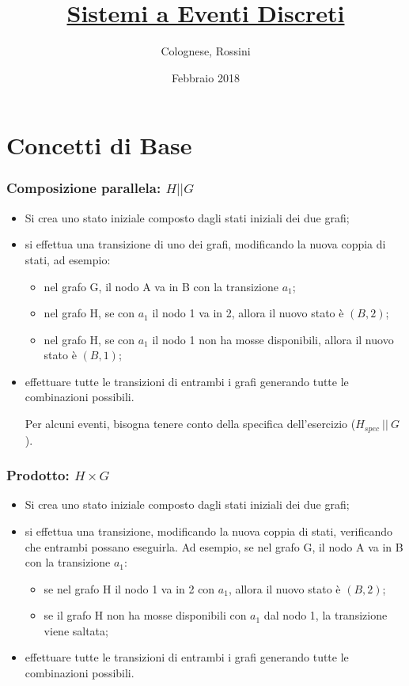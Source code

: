 \documentclass[a4paper, notitlepage, 10pt]{report}
\makeatletter
\newcommand*{\toccontents}{\@starttoc{toc}}
\makeatother
\begin{document}
	\title{\textbf{\underline{Sistemi a Eventi Discreti}}}
	\date{Febbraio 2018}
	\author{Colognese, Rossini}
	\maketitle
	
	\toccontents

\chapter*{Concetti di Base}

\subsection*{Composizione parallela: $H || G$}
\begin{itemize}
	\item Si crea uno stato iniziale composto dagli stati iniziali dei due grafi;
	\item si effettua una transizione di uno dei grafi, modificando la nuova coppia di stati, ad esempio:
	\begin{itemize}
		\item nel grafo G, il nodo A va in B con la transizione $a_1$;
		\item nel grafo H, se con $a_1$ il nodo 1 va in 2, allora il nuovo stato è $(B, 2)$;
		\item nel grafo H, se con $a_1$ il nodo 1 non ha mosse disponibili, allora il nuovo stato è $(B, 1)$;
	\end{itemize}
	\item effettuare tutte le transizioni di entrambi i grafi generando tutte le combinazioni possibili.
	
	Per alcuni eventi, bisogna tenere conto della specifica dell'esercizio ($H_{spec} ~||~ G$).
\end{itemize}

\subsection*{Prodotto: $H \times G$}
\begin{itemize}
	\item Si crea uno stato iniziale composto dagli stati iniziali dei due grafi;
	\item si effettua una transizione, modificando la nuova coppia di stati, verificando che entrambi possano eseguirla. Ad esempio, se nel grafo G, il nodo A va in B con la transizione $a_1$:
	\begin{itemize}
		\item se nel grafo H il nodo 1 va in 2 con $a_1$, allora il nuovo stato è $(B, 2)$;
		\item se il grafo H non ha mosse disponibili con $a_1$ dal nodo 1, la transizione viene saltata;
	\end{itemize}
	\item effettuare tutte le transizioni di entrambi i grafi generando tutte le combinazioni possibili.
\end{itemize}
\end{document}
